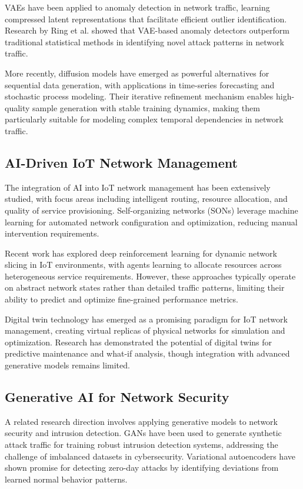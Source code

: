 \documentclass[conference]{IEEEtran}
\begin{document}
VAEs have been applied to anomaly detection in network traffic, learning compressed latent representations that facilitate efficient outlier identification. Research by Ring et al. showed that VAE-based anomaly detectors outperform traditional statistical methods in identifying novel attack patterns in network traffic.

More recently, diffusion models have emerged as powerful alternatives for sequential data generation, with applications in time-series forecasting and stochastic process modeling. Their iterative refinement mechanism enables high-quality sample generation with stable training dynamics, making them particularly suitable for modeling complex temporal dependencies in network traffic.

\subsection{AI-Driven IoT Network Management}

The integration of AI into IoT network management has been extensively studied, with focus areas including intelligent routing, resource allocation, and quality of service provisioning. Self-organizing networks (SONs) leverage machine learning for automated network configuration and optimization, reducing manual intervention requirements.

Recent work has explored deep reinforcement learning for dynamic network slicing in IoT environments, with agents learning to allocate resources across heterogeneous service requirements. However, these approaches typically operate on abstract network states rather than detailed traffic patterns, limiting their ability to predict and optimize fine-grained performance metrics.

Digital twin technology has emerged as a promising paradigm for IoT network management, creating virtual replicas of physical networks for simulation and optimization. Research has demonstrated the potential of digital twins for predictive maintenance and what-if analysis, though integration with advanced generative models remains limited.

\subsection{Generative AI for Network Security}

A related research direction involves applying generative models to network security and intrusion detection. GANs have been used to generate synthetic attack traffic for training robust intrusion detection systems, addressing the challenge of imbalanced datasets in cybersecurity. Variational autoencoders have shown promise for detecting zero-day attacks by identifying deviations from learned normal behavior patterns.
\end{document}
